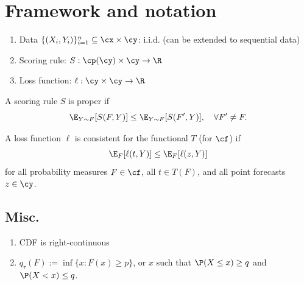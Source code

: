 \section{Framework and notation}

\begin{enumerate}
    \item Data $\{(X_i, Y_i)\}_{i=1}^n \subseteq \cx \times \cy$: i.i.d. (can be extended to sequential data)
    \item Scoring rule: $S: \cp(\cy) \times \cy \to \R$
    \item Loss function: $\ell: \cy \times \cy \to \R$
\end{enumerate}

\begin{defi}
    A scoring rule $S$ is proper if 
    \[
    \E_{Y \sim F}[S(F, Y)] \leq \E_{Y \sim F}[S(F', Y)], \quad \forall F' \neq F.
    \]
\end{defi}

\begin{defi}
    A loss function $\ell$ is consistent for the functional $T$ (for $\cf$) if 
    \[
    \E_F[\ell(t,Y)] \leq \E_F[\ell(z,Y)]
    \]
    for all probability measures $F \in \cf$, all $t \in T(F)$, and all point forecasts $z \in \cy$.
\end{defi}

\subsection{Misc.}
\begin{enumerate}
    \item CDF is right-continuous
    \item $q_\tau(F) := \inf\{x: F(x) \geq p\}$, or $x$ such that $\P(X\leq x) \geq q$ and $\P(X < x) \leq q$. 
\end{enumerate}